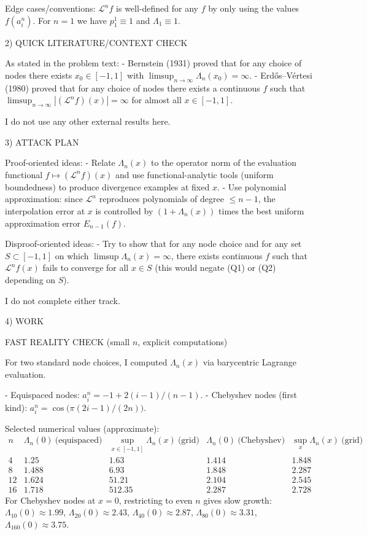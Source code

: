 Edge cases/conventions: $\mathcal L^n f$ is well-defined for any $f$ by only using the values $f(a_i^n)$. For $n=1$ we have $p_1^1\equiv 1$ and $\Lambda_1\equiv 1$.

2) QUICK LITERATURE/CONTEXT CHECK

As stated in the problem text:
- Bernstein (1931) proved that for any choice of nodes there exists $x_0\in[-1,1]$ with $\limsup_{n\to\infty}\Lambda_n(x_0)=\infty$.
- Erd\H{o}s--V\'{e}rtesi (1980) proved that for any choice of nodes there exists a continuous $f$ such that $\limsup_{n\to\infty}|(\mathcal L^n f)(x)|=\infty$ for almost all $x\in[-1,1]$.

I do not use any other external results here.

3) ATTACK PLAN

Proof-oriented ideas:
- Relate $\Lambda_n(x)$ to the operator norm of the evaluation functional $f\mapsto (\mathcal L^n f)(x)$ and use functional-analytic tools (uniform boundedness) to produce divergence examples at fixed $x$.
- Use polynomial approximation: since $\mathcal L^n$ reproduces polynomials of degree $\le n-1$, the interpolation error at $x$ is controlled by $(1+\Lambda_n(x))$ times the best uniform approximation error $E_{n-1}(f)$.

Disproof-oriented ideas:
- Try to show that for any node choice and for any set $S\subset[-1,1]$ on which $\limsup\Lambda_n(x)=\infty$, there exists continuous $f$ such that $\mathcal L^n f(x)$ fails to converge for all $x\in S$ (this would negate (Q1) or (Q2) depending on $S$).

I do not complete either track.

4) WORK

FAST REALITY CHECK (small $n$, explicit computations)

For two standard node choices, I computed $\Lambda_n(x)$ via barycentric Lagrange evaluation.

- Equispaced nodes: $a_i^n=-1+2(i-1)/(n-1)$.
- Chebyshev nodes (first kind): $a_i^n=\cos\bigl(\pi(2i-1)/(2n)\bigr)$.

Selected numerical values (approximate):
\[
\begin{array}{c|cc|cc}
 n & \Lambda_n(0)\ \text{(equispaced)} & \sup_{x\in[-1,1]}\Lambda_n(x)\ \text{(grid)} & \Lambda_n(0)\ \text{(Chebyshev)} & \sup_x\Lambda_n(x)\ \text{(grid)}\\\hline
 4 & 1.25 & 1.63 & 1.414 & 1.848\\
 8 & 1.488 & 6.93 & 1.848 & 2.287\\
 12 & 1.624 & 51.21 & 2.104 & 2.545\\
 16 & 1.718 & 512.35 & 2.287 & 2.728
\end{array}
\]
For Chebyshev nodes at $x=0$, restricting to even $n$ gives slow growth: $\Lambda_{10}(0)\approx1.99$, $\Lambda_{20}(0)\approx2.43$, $\Lambda_{40}(0)\approx2.87$, $\Lambda_{80}(0)\approx3.31$, $\Lambda_{160}(0)\approx3.75$.

